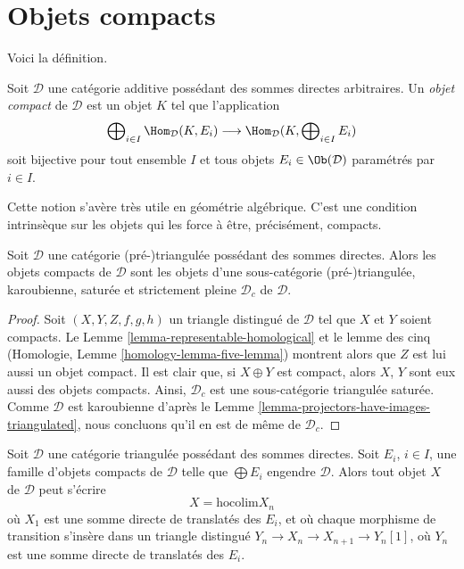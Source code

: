 \section{Objets compacts}
\label{section-compact}

\noindent
Voici la définition.

\begin{definition}
\label{definition-compact-object}
Soit $\mathcal{D}$ une catégorie additive possédant des sommes directes
arbitraires. Un {\it objet compact} de $\mathcal{D}$ est un objet $K$ tel que
l'application
$$
\bigoplus\nolimits_{i \in I} \Hom_{\mathcal{D}}(K, E_i)
\longrightarrow
\Hom_{\mathcal{D}}(K, \bigoplus\nolimits_{i \in I} E_i)
$$
soit bijective pour tout ensemble $I$ et tous objets
$E_i \in \Ob(\mathcal{D})$ paramétrés par $i \in I$.
\end{definition}

\noindent
Cette notion s'avère très utile en géométrie algébrique. C'est une condition
intrinsèque sur les objets qui les force à être, précisément, compacts.

\begin{lemma}
\label{lemma-compact-objects-subcategory}
Soit $\mathcal{D}$ une catégorie (pré-)triangulée possédant des sommes
directes. Alors les objets compacts de $\mathcal{D}$ sont les objets d'une
sous-catégorie (pré-)triangulée, karoubienne, saturée et strictement pleine
$\mathcal{D}_c$ de $\mathcal{D}$.
\end{lemma}

\begin{proof}
Soit $(X, Y, Z, f, g, h)$ un triangle distingué de $\mathcal{D}$ tel que
$X$ et $Y$ soient compacts. Le Lemme \ref{lemma-representable-homological} et
le lemme des cinq (Homologie, Lemme \ref{homology-lemma-five-lemma}) montrent
alors que $Z$ est lui aussi un objet compact. Il est clair que, si
$X \oplus Y$ est compact, alors $X$, $Y$ sont eux aussi des objets compacts.
Ainsi, $\mathcal{D}_c$ est une sous-catégorie triangulée saturée.
Comme $\mathcal{D}$ est karoubienne d'après le
Lemme \ref{lemma-projectors-have-images-triangulated}, nous concluons qu'il en
est de même de $\mathcal{D}_c$.
\end{proof}

\begin{lemma}
\label{lemma-write-as-colimit}
Soit $\mathcal{D}$ une catégorie triangulée possédant des sommes directes.
Soit $E_i$, $i \in I$, une famille d'objets compacts de $\mathcal{D}$ telle
que $\bigoplus E_i$ engendre $\mathcal{D}$.
Alors tout objet $X$ de $\mathcal{D}$ peut s'écrire
$$
X = \text{hocolim} X_n
$$
où $X_1$ est une somme directe de translatés des $E_i$, et où chaque morphisme
de transition s'insère dans un triangle distingué
$Y_n \to X_n \to X_{n + 1} \to Y_n[1]$, où $Y_n$ est une somme directe de
translatés des $E_i$.
\end{lemma}

